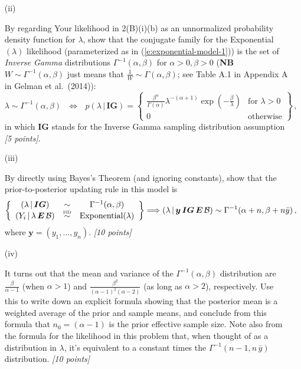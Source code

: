\documentclass[12pt]{article}
\newcommand{\given}{\, | \,}
\newcommand{\given}{\, | \,}
\begin{document}
\begin{itemize}
\begin{itemize}
\begin{itemize}
\end{itemize}

\item[(ii)]

By regarding Your likelihood in 2(B)(i)(b) as an unnormalized probability density function for $\lambda$, show that the conjugate family for the Exponential$( \lambda )$ likelihood (parameterized as in (\ref{e:exponential-model-1})) is the set of \textit{Inverse Gamma} distributions $\Gamma^{ -1 } ( \alpha, \beta )$ for $\alpha > 0, \beta > 0$ (\textbf{NB} $W \sim \Gamma^{ -1 } ( \alpha, \beta )$ just means that $\frac{ 1 }{ W } \sim \Gamma ( \alpha, \beta )$; see Table A.1 in Appendix A in Gelman et al.~(2014)):
\begin{equation} \label{e:inverse-gamma-1}
\lambda \sim \Gamma^{ -1 } ( \alpha, \beta ) \ \ \ \iff \ \ \ p ( \lambda \given \bm{ IG } ) = \left\{ \begin{array}{cc} \frac{ \beta^\alpha }{ \Gamma ( \alpha ) }
\lambda^{ - ( \alpha + 1 ) } \exp \left( - \frac{ \beta }{ \lambda } \right)
& \textrm{for } \lambda > 0 \\ 0 & \mbox{otherwise} \end{array} \right\} \, ,
\end{equation}
in which $\bm{ IG }$ stands for the Inverse Gamma sampling distribution assumption \textit{[5 points]}.

\item[(iii)]

By directly using Bayes's Theorem (and ignoring constants), show that
the prior-to-posterior updating rule in this model is
\begin{equation} \label{e:updating-1}
\left\{ \begin{array}{ccc} ( \lambda \given \bm{ IG } )& \sim & \Gamma^{ -1 } ( \alpha, \beta )
\\ ( Y_i \given \lambda \, \bm{ E } \, \mathcal{ B } ) & \stackrel{ \mbox{\tiny IID} }{ \sim } & \textrm{Exponential} ( \lambda ) \end{array} \right\} \Longrightarrow ( \lambda \given \bm{ y } \, \bm{ IG } \, \bm{ E } \, \mathcal{ B } ) \sim \Gamma^{ -1 } ( \alpha + n, \beta + n \bar{ y } ) \, ,
\end{equation}
where $\bm{ y } = ( y_1, \dots, y_n )$. \textit{[10 points]}

\item[(iv)]

It turns out that the mean and variance of the $\Gamma^{ -1 } (
\alpha, \beta )$ distribution are $\frac{ \beta }{ \alpha - 1}$ (when $\alpha > 1$) and $\frac{ \beta^2 }{ ( \alpha - 1 )^2 ( \alpha - 2 ) }$ (as long as
$\alpha > 2$), respectively. Use this to write down an explicit formula showing that the posterior mean is a weighted average of the prior and sample means, and
conclude from this formula that $n_0 = ( \alpha - 1 )$ is the prior effective
sample size. Note also from the formula for the likelihood in this problem
that, when thought of as a distribution in $\lambda$, it's equivalent to a
constant times the $\Gamma^{ -1 } ( n - 1, n \, \bar{ y } )$ distribution. \textit{[10 points]} 


\end{itemize}
\end{itemize}
\end{document}

